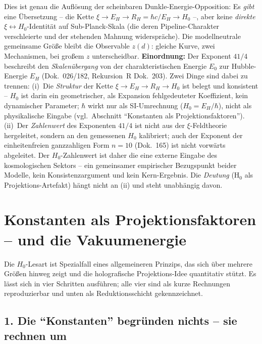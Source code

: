 Dies ist genau die Auflösung der scheinbaren Dunkle-Energie-Opposition: Es
\emph{gibt} eine Übersetzung -- die Kette $\xi \to E_H \to R_H = \hbar c/E_H
\to H_0$ --, aber keine \emph{direkte} $\xi \leftrightarrow H_0$-Identität auf
Sub-Planck-Skala (die deren Pipeline-Charakter verschleierte und der stehenden
Mahnung widerspräche). Die modellneutrale gemeinsame Größe bleibt die
Observable $z(d)$: gleiche Kurve, zwei Mechanismen, bei großem $z$
unterscheidbar. \textbf{Einordnung:} Der Exponent $41/4$ beschreibt
den \emph{Skalenübergang} von der
charakteristischen Energie $E_0$ zur Hubble-Energie $E_H$
(Dok.~026/182, Rekursion~R
Dok.~203). Zwei Dinge sind dabei zu trennen: (i)~Die \emph{Struktur} der Kette
$\xi\to E_H\to R_H\to H_0$ ist belegt und konsistent -- $H_0$ ist darin ein
geometrischer, als Expansion fehlgedeuteter Koeffizient, kein dynamischer
Parameter; $\hbar$ wirkt nur als SI-Umrechnung ($H_0=E_H/\hbar$), nicht als
physikalische Eingabe (vgl.\ Abschnitt \enquote{Konstanten als
Projektionsfaktoren}). (ii)~Der \emph{Zahlenwert} des Exponenten $41/4$ ist
nicht aus der $\xi$-Feldtheorie hergeleitet, sondern an den gemessenen $H_0$
kalibriert; auch der Exponent der einheitenfreien ganzzahligen Form $n=10$
(Dok.~165) ist nicht vorwärts abgeleitet. Der $H_0$-Zahlenwert ist daher die
eine externe Eingabe des kosmologischen Sektors -- ein gemeinsamer empirischer
Bezugspunkt beider Modelle, kein Konsistenzargument und kein Kern-Ergebnis.
Die \emph{Deutung} (H$_0$ als Projektions-Artefakt) hängt nicht
an (ii) und steht unabhängig davon.

\section{Konstanten als Projektionsfaktoren -- und die Vakuumenergie}

Die $H_0$-Lesart ist Spezialfall eines allgemeineren Prinzips, das sich
über mehrere Größen hinweg zeigt und die holografische Projektions-Idee
quantitativ stützt. Es lässt sich in vier Schritten ausführen; alle vier
sind als kurze Rechnungen reproduzierbar und unten als Reduktionsschicht
gekennzeichnet.

\subsection*{1. Die \enquote{Konstanten} begründen nichts -- sie rechnen um}

